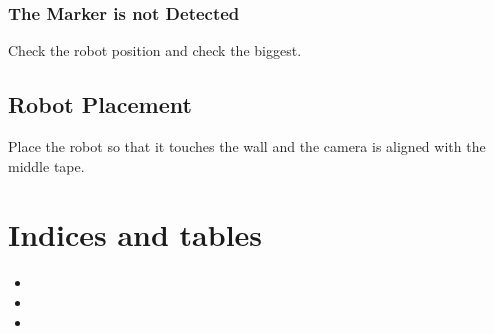 \documentclass[letterpaper,10pt,english]{sphinxmanual}
\begin{document}
\subsection{The Marker is not Detected}
\label{\detokenize{common_errors:the-marker-is-not-detected}}
\sphinxAtStartPar
Check the robot position and check the biggest.


\section{Robot Placement}
\label{\detokenize{robot_placement:robot-placement}}\label{\detokenize{robot_placement::doc}}
\sphinxAtStartPar
Place the robot so that it touches the wall and the camera is aligned with the middle tape.


\chapter{Indices and tables}
\label{\detokenize{index:indices-and-tables}}\begin{itemize}
\item {} 
\sphinxAtStartPar
{}

\item {} 
\sphinxAtStartPar
{}

\item {} 
\sphinxAtStartPar
{}

\end{itemize}



\renewcommand{\indexname}{Index}
\printindex
\end{document}
